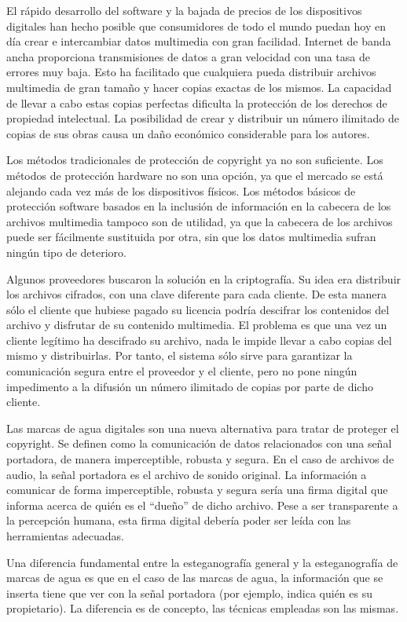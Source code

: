 \documentclass[12pt]{article}
\begin{document}
El rápido desarrollo del software y la bajada de precios de los dispositivos digitales han hecho posible que consumidores de todo el mundo puedan hoy en día crear e intercambiar datos multimedia con gran facilidad. Internet de banda ancha proporciona transmisiones de datos a gran velocidad con una tasa de errores muy baja. Esto ha facilitado que cualquiera pueda distribuir archivos multimedia de gran tamaño y hacer copias exactas de los mismos. La capacidad de llevar a cabo estas copias perfectas dificulta la protección de los derechos de propiedad intelectual. La posibilidad de crear y distribuir un número ilimitado de copias de sus obras causa un daño económico considerable para los autores.

Los métodos tradicionales de protección de copyright ya no son suficiente. Los métodos de protección hardware no son una opción, ya que el mercado se está alejando cada vez más de los dispositivos físicos. Los métodos básicos de protección software basados en la inclusión de información en la cabecera de los archivos multimedia tampoco son de utilidad, ya que la cabecera de los archivos puede ser fácilmente sustituida por otra, sin que los datos multimedia sufran ningún tipo de deterioro.

Algunos proveedores buscaron la solución en la criptografía. Su idea era distribuir los archivos cifrados, con una clave diferente para cada cliente. De esta manera sólo el cliente que hubiese pagado su licencia podría descifrar los contenidos del archivo y disfrutar de su contenido multimedia. El problema es que una vez un cliente legítimo ha descifrado su archivo, nada le impide llevar a cabo copias del mismo y distribuirlas. Por tanto, el sistema sólo sirve para garantizar la comunicación segura entre el proveedor y el cliente, pero no pone ningún impedimento a la difusión un número ilimitado de copias por parte de dicho cliente.

Las marcas de agua digitales son una nueva alternativa para tratar de proteger el copyright. Se definen como la comunicación de datos relacionados con una señal portadora, de manera imperceptible, robusta y segura. En el caso de archivos de audio, la señal portadora es el archivo de sonido original. La información a comunicar de forma imperceptible, robusta y segura sería una firma digital que informa acerca de quién es el ``dueño'' de dicho archivo. Pese a ser transparente a la percepción humana, esta firma digital debería poder ser leída con las herramientas adecuadas.

Una diferencia fundamental entre la esteganografía general y la esteganografía de marcas de agua es que en el caso de las marcas de agua, la información que se inserta tiene que ver con la señal portadora (por ejemplo, indica quién es su propietario). La diferencia es de concepto, las técnicas empleadas son las mismas.
\end{document}
